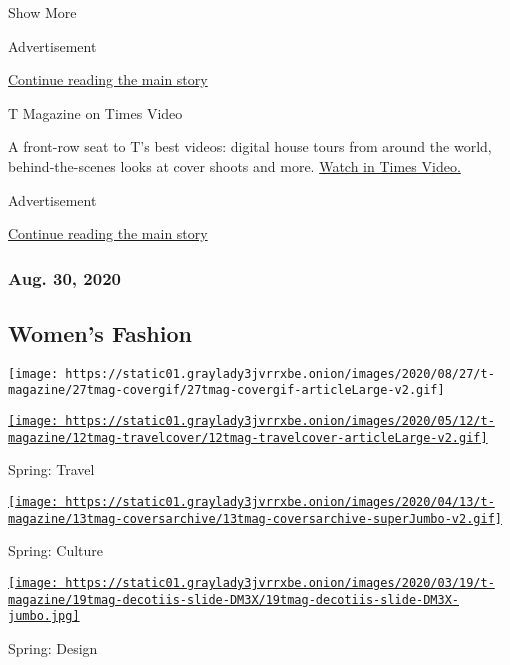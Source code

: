 Show More

Advertisement

\protect\hyperlink{after-mid2}{Continue reading the main story}

T Magazine on Times Video

A front-row seat to T's best videos: digital house tours from around the
world, behind-the-scenes looks at cover shoots and more.
\href{https://www.nytimes3xbfgragh.onion/video/t-magazine}{Watch in
Times Video.}

Advertisement

\protect\hyperlink{after-mktg}{Continue reading the main story}

\hypertarget{aug-30-2020}{%
\subsubsection{Aug. 30, 2020}\label{aug-30-2020}}

\href{https://www.nytimes3xbfgragh.onion/issue/t-magazine/2020/08/21/ts-aug-30-womens-fashion-issue}{}

\hypertarget{womens-fashion}{%
\subsection{Women's Fashion}\label{womens-fashion}}

\texttt{[image: https://static01.graylady3jvrrxbe.onion/images/2020/08/27/t-magazine/27tmag-covergif/27tmag-covergif-articleLarge-v2.gif]}

\href{https://www.nytimes3xbfgragh.onion/issue/t-magazine/2020/05/02/ts-may-17-travel-issue}{\texttt{[image: https://static01.graylady3jvrrxbe.onion/images/2020/05/12/t-magazine/12tmag-travelcover/12tmag-travelcover-articleLarge-v2.gif]}}

Spring: Travel

\href{https://www.nytimes3xbfgragh.onion/issue/t-magazine/2020/04/12/ts-april-19-culture-issue}{\texttt{[image: https://static01.graylady3jvrrxbe.onion/images/2020/04/13/t-magazine/13tmag-coversarchive/13tmag-coversarchive-superJumbo-v2.gif]}}

Spring: Culture

\href{https://www.nytimes3xbfgragh.onion/issue/t-magazine/2020/03/06/ts-march-22-design-issue}{\texttt{[image: https://static01.graylady3jvrrxbe.onion/images/2020/03/19/t-magazine/19tmag-decotiis-slide-DM3X/19tmag-decotiis-slide-DM3X-jumbo.jpg]}}

Spring: Design

